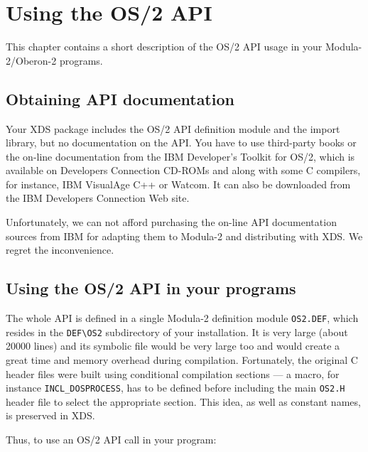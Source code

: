 \chapter{Using the OS/2 API}
\label{os2api}

This chapter contains a short description of the OS/2 API usage
in your Modula-2/Oberon-2 programs.

\section{Obtaining API documentation}

Your XDS package includes the OS/2 API definition module and the import
library, but no documentation on the API. You have to use
third-party books or the on-line documentation from the
IBM Developer's Toolkit for OS/2, which is available on
Developers Connection CD-ROMs and along with some C compilers,
for instance, IBM VisualAge C++ or Watcom. It can also be downloaded
from the IBM Developers Connection Web site. %

Unfortunately, we can not afford purchasing the on-line API
documentation sources from IBM for adapting them to Modula-2
and distributing with XDS. We regret the inconvenience.

\section{Using the OS/2 API in your programs}

The whole API is defined in a single Modula-2 definition module \verb'OS2.DEF',
which resides in the \verb'DEF\OS2' subdirectory of your \XDS{} installation.
It is very large (about 20000 lines) and its symbolic file would be very large too
and would create a great time and memory overhead during compilation.
Fortunately, the original C header files were built using conditional
compilation sections --- a macro, for instance \verb'INCL_DOSPROCESS', has to be
defined before including the main \verb'OS2.H' header file to select the
appropriate section. This idea, as well as constant names, is preserved
in XDS.

Thus, to use an OS/2 API call in your program:

